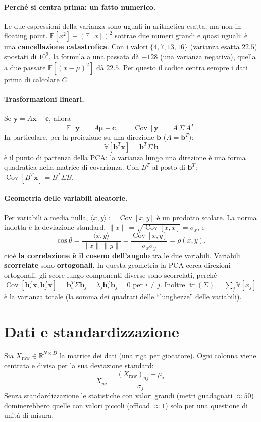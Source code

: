 \documentclass[11pt,a4paper]{article}
\theoremstyle{remark}
\newcommand{\R}{\mathbb{R}}
\newcommand{\bb}{\mathbf{b}}
\newcommand{\x}{\mathbf{x}}
\begin{document}
\paragraph{Perch\'e si centra prima: un fatto numerico.}
Le due espressioni della varianza sono uguali in aritmetica esatta, ma non in floating point.
$\mathbb{E}[x^2]-(\mathbb{E}[x])^2$ sottrae due numeri grandi e quasi uguali: \`e una
\textbf{cancellazione catastrofica}. Con i valori $\{4,7,13,16\}$ (varianza esatta $22.5$) spostati
di $10^9$, la formula a una passata d\`a $-128$ (una varianza negativa), quella a due passate
$\mathbb{E}[(x-\mu)^2]$ d\`a $22.5$. Per questo il codice centra sempre i dati prima di calcolare $C$.

\paragraph{Trasformazioni lineari.}
Se $\mathbf y=A\x+\mathbf c$, allora
\[
\mathbb{E}[\mathbf y]=A\boldsymbol\mu+\mathbf c,\qquad \operatorname{Cov}[\mathbf y]=A\,\Sigma\,A^T .
\]
In particolare, per la proiezione su una direzione $\bb$ ($A=\bb^T$):
\[
\boxed{\ \mathbb{V}[\bb^T\x]=\bb^T\Sigma\,\bb\ }
\]
\`e il punto di partenza della PCA: la varianza lungo una direzione \`e una forma quadratica nella
matrice di covarianza. Con $B^T$ al posto di $\bb^T$: $\operatorname{Cov}[B^T\x]=B^T\Sigma B$.

\paragraph{Geometria delle variabili aleatorie.}
Per variabili a media nulla, $\langle x,y\rangle:=\operatorname{Cov}[x,y]$ \`e un prodotto scalare.
La norma indotta \`e la deviazione standard, $\|x\|=\sqrt{\operatorname{Cov}[x,x]}=\sigma_x$, e
\[
\cos\theta=\frac{\langle x,y\rangle}{\|x\|\,\|y\|}=\frac{\operatorname{Cov}[x,y]}{\sigma_x\sigma_y}=\rho(x,y),
\]
cio\`e \textbf{la correlazione \`e il coseno dell'angolo} tra le due variabili.
Variabili \textbf{scorrelate} sono \textbf{ortogonali}. In questa geometria la PCA cerca direzioni
ortogonali: gli score lungo componenti diverse sono scorrelati, perch\'e
$\operatorname{Cov}[\bb_i^T\x,\bb_j^T\x]=\bb_i^T\Sigma\bb_j=\lambda_j\bb_i^T\bb_j=0$ per $i\ne j$.
Inoltre $\operatorname{tr}(\Sigma)=\sum_j\mathbb{V}[x_j]$ \`e la varianza totale (la somma dei quadrati
delle ``lunghezze'' delle variabili).

\section{Dati e standardizzazione}
Sia $X_{\text{raw}}\in\R^{N\times D}$ la matrice dei dati (una riga per giocatore).
Ogni colonna viene centrata e divisa per la sua deviazione standard:
\[
X_{nj}=\frac{(X_{\text{raw}})_{nj}-\mu_j}{\sigma_j}.
\]
Senza standardizzazione le statistiche con valori grandi (metri guadagnati $\approx 50$)
dominerebbero quelle con valori piccoli (offload $\approx 1$) solo per una questione di unit\`a di misura.
\end{document}
